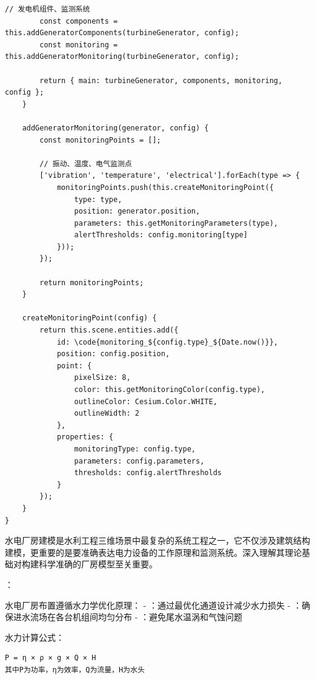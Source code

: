 \begin{lstlisting}[style=javascript]
        // 发电机组件、监测系统
        const components = this.addGeneratorComponents(turbineGenerator, config);
        const monitoring = this.addGeneratorMonitoring(turbineGenerator, config);
        
        return { main: turbineGenerator, components, monitoring, config };
    }
    
    addGeneratorMonitoring(generator, config) {
        const monitoringPoints = [];
        
        // 振动、温度、电气监测点
        ['vibration', 'temperature', 'electrical'].forEach(type => {
            monitoringPoints.push(this.createMonitoringPoint({
                type: type,
                position: generator.position,
                parameters: this.getMonitoringParameters(type),
                alertThresholds: config.monitoring[type]
            }));
        });
        
        return monitoringPoints;
    }
    
    createMonitoringPoint(config) {
        return this.scene.entities.add({
            id: \code{monitoring_${config.type}_${Date.now()}},
            position: config.position,
            point: {
                pixelSize: 8,
                color: this.getMonitoringColor(config.type),
                outlineColor: Cesium.Color.WHITE,
                outlineWidth: 2
            },
            properties: {
                monitoringType: config.type,
                parameters: config.parameters,
                thresholds: config.alertThresholds
            }
        });
    }
}
\end{lstlisting}


水电厂房建模是水利工程三维场景中最复杂的系统工程之一，它不仅涉及建筑结构建模，更重要的是要准确表达电力设备的工作原理和监测系统。深入理解其理论基础对构建科学准确的厂房模型至关重要。

：


水电厂房布置遵循水力学优化原理： - ：通过最优化通道设计减少水力损失 - ：确保进水流场在各台机组间均匀分布 - ：避免尾水温涡和气蚀问题

水力计算公式：

\begin{lstlisting}
P = η × ρ × g × Q × H
其中P为功率，η为效率，Q为流量，H为水头
\end{lstlisting}

